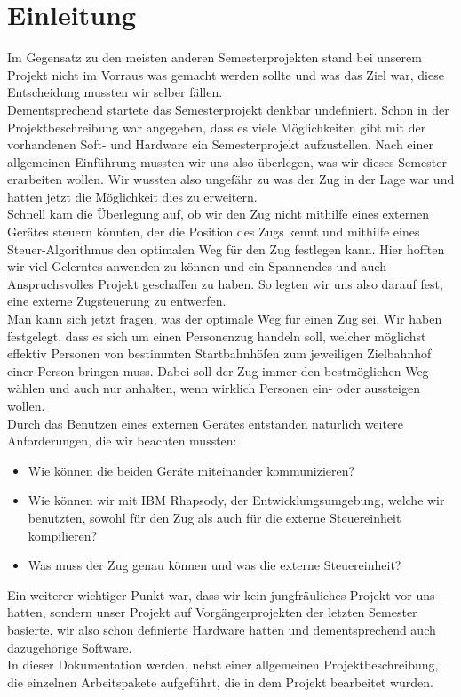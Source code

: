 \chapter{Einleitung}

Im Gegensatz zu den meisten anderen Semesterprojekten stand bei unserem Projekt nicht im Vorraus was gemacht werden sollte und was das Ziel war, diese Entscheidung mussten wir selber fällen.\\
Dementsprechend startete das Semesterprojekt denkbar undefiniert. Schon in der Projektbeschreibung war angegeben, dass es viele Möglichkeiten gibt mit der vorhandenen Soft- und Hardware ein Semesterprojekt aufzustellen. Nach einer allgemeinen Einführung mussten wir uns also überlegen, was wir dieses Semester erarbeiten wollen. Wir wussten also ungefähr zu was der Zug in der Lage war und hatten jetzt die Möglichkeit dies zu erweitern.\\
Schnell kam die Überlegung auf, ob wir den Zug nicht mithilfe eines externen Gerätes steuern könnten, der die Position des Zugs kennt und mithilfe eines Steuer-Algorithmus den optimalen Weg für den Zug festlegen kann. Hier hofften wir viel Gelerntes anwenden zu können und ein Spannendes und auch Anspruchsvolles Projekt geschaffen zu haben. So legten wir uns also darauf fest, eine externe Zugsteuerung zu entwerfen.\\
Man kann sich jetzt fragen, was der optimale Weg für einen Zug sei. Wir haben festgelegt, dass es sich um einen Personenzug handeln soll, welcher möglichst effektiv Personen von bestimmten Startbahnhöfen zum jeweiligen Zielbahnhof einer Person bringen muss. Dabei soll der Zug immer den bestmöglichen Weg wählen und auch nur anhalten, wenn wirklich Personen ein- oder aussteigen wollen.\\
Durch das Benutzen eines externen Gerätes entstanden natürlich weitere Anforderungen, die wir beachten mussten:
\begin{itemize}
	\item Wie können die beiden Geräte miteinander kommunizieren?
	\item Wie können wir mit IBM Rhapsody, der Entwicklungsumgebung, welche wir benutzten, sowohl für den Zug als auch für die externe Steuereinheit kompilieren?
	\item Was muss der Zug genau können und was die externe Steuereinheit?
\end{itemize}
Ein weiterer wichtiger Punkt war, dass wir kein jungfräuliches Projekt vor uns hatten, sondern unser Projekt auf Vorgängerprojekten der letzten Semester basierte, wir also schon definierte Hardware hatten und dementsprechend auch dazugehörige Software.\\ 
In dieser Dokumentation werden, nebst einer allgemeinen Projektbeschreibung, die einzelnen Arbeitspakete aufgeführt, die in dem Projekt bearbeitet wurden.
